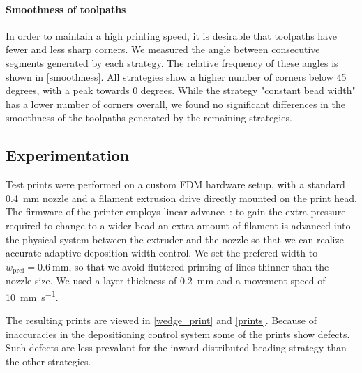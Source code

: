 \paragraph{Smoothness of toolpaths}
In order to maintain a high printing speed, it is desirable that toolpaths have fewer and less sharp corners. 
We measured the angle between consecutive segments generated by each strategy.
The relative frequency of these angles is shown in \cref{smoothness}.
All strategies show a higher number of corners below 45 degrees, with a peak towards 0 degrees.
While the strategy "constant bead width" has a lower number of corners overall, we found no significant differences in the smoothness of the toolpaths generated by the remaining strategies. 

\subsection{Experimentation}
Test prints were performed on a custom FDM hardware setup, with a standard \SI{0.4}{\milli\meter} nozzle and a filament extrusion drive directly mounted on the print head.
The firmware of the printer employs linear advance~\cite{linadvance}: to gain the extra pressure required to change to a wider bead an extra amount of filament is advanced into the physical system between the extruder and the nozzle so that we can realize accurate adaptive deposition width control.
We set the prefered width to $w_\text{pref} = \SI{0.6}{\milli\meter}$, so that we avoid fluttered printing of lines thinner than the nozzle size.
We used a layer thickness of \SI{0.2}{\milli\meter} and a movement speed of \SI{10}{\milli\meter\per\second}.

The resulting prints are viewed in \cref{wedge_print} and \cref{prints}.
Because of inaccuracies in the depositioning control system some of the prints show defects.
Such defects are less prevalant for the inward distributed beading strategy than the other strategies.


